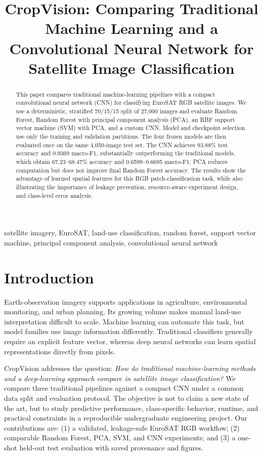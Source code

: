 \documentclass[conference]{IEEEtran}
\title{CropVision: Comparing Traditional Machine Learning and a Convolutional Neural Network for Satellite Image Classification}
\author{
\IEEEauthorblockN{Malik SAADI, Edgar PRADET, Etienne SIOEN}
\IEEEauthorblockA{
\textit{School of Computer Science, Hanyang University (exchange)}\\
Seoul, Republic of Korea\\
\{malik.saadi, edgar.pradet\}@edu.ece.fr, etienne.sioen@edu.devinci.fr}
}
\begin{document}
\maketitle

\begin{abstract}
This paper compares traditional machine-learning pipelines with a compact
convolutional neural network (CNN) for classifying EuroSAT RGB satellite
images. We use a deterministic, stratified 70/15/15 split of 27,000 images and
evaluate Random Forest, Random Forest with principal component analysis (PCA),
an RBF support vector machine (SVM) with PCA, and a custom CNN. Model and
checkpoint selection use only the training and validation partitions. The four
frozen models are then evaluated once on the same 4,050-image test set. The CNN
achieves 93.88\% test accuracy and 0.9369 macro-F1, substantially outperforming
the traditional models, which obtain 67.23--68.47\% accuracy and
0.6599--0.6695 macro-F1. PCA reduces computation but does not improve final
Random Forest accuracy. The results show the advantage of learned spatial
features for this RGB patch-classification task, while also illustrating the
importance of leakage prevention, resource-aware experiment design, and
class-level error analysis.
\end{abstract}

\begin{IEEEkeywords}
satellite imagery, EuroSAT, land-use classification, random forest, support
vector machine, principal component analysis, convolutional neural network
\end{IEEEkeywords}

\section{Introduction}

Earth-observation imagery supports applications in agriculture,
environmental monitoring, and urban planning. Its growing volume makes manual
land-use interpretation difficult to scale. Machine learning can automate this
task, but model families use image information differently. Traditional
classifiers generally require an explicit feature vector, whereas deep neural
networks can learn spatial representations directly from pixels.

CropVision addresses the question: \emph{How do traditional machine-learning
methods and a deep-learning approach compare in satellite image
classification?} We compare three traditional pipelines against a compact CNN
under a common data split and evaluation protocol. The objective is not to
claim a new state of the art, but to study predictive performance,
class-specific behavior, runtime, and practical constraints in a reproducible
undergraduate engineering project. Our contributions are: (1) a validated,
leakage-safe EuroSAT RGB workflow; (2) comparable Random Forest, PCA, SVM, and
CNN experiments; and (3) a one-shot held-out test evaluation with saved
provenance and figures.
\end{document}
